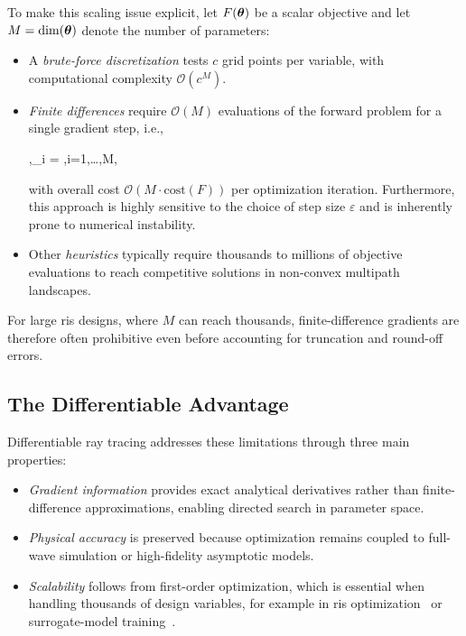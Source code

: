 To make this scaling issue explicit, let $F(\boldsymbol{\theta})$ be a scalar objective and let $M=\dim(\boldsymbol{\theta})$ denote the number of parameters:
\begin{itemize}
  \item A \emph{brute-force discretization} tests $c$ grid points per variable, with computational complexity $\mathcal{O}(c^M)$.
  \item \emph{Finite differences} require $\mathcal{O}(M)$ evaluations of the forward problem for a single gradient step, i.e.,
    \begin{wideequation}
       \approx {},\quad {}_i = ,\quad i=1,\ldots,M,
    \end{wideequation}
    with overall cost $\mathcal{O}(M\cdot\text{cost}(F))$ per optimization iteration. Furthermore, this approach is highly sensitive to the choice of step size $\varepsilon$ and is inherently prone to numerical instability.
  \item Other \emph{heuristics} typically require thousands to millions of objective evaluations to reach competitive solutions in non-convex multipath landscapes.
\end{itemize}

For large \gls{ris} designs, where $M$ can reach thousands, finite-difference gradients are therefore often prohibitive even before accounting for truncation and round-off errors.

\subsection{The Differentiable Advantage}

Differentiable ray tracing addresses these limitations through three main properties:
\begin{itemize}
  \item \emph{Gradient information} provides exact analytical derivatives rather than finite-difference approximations, enabling directed search in parameter space.
  \item \emph{Physical accuracy} is preserved because optimization remains coupled to full-wave simulation or high-fidelity asymptotic models.
  \item \emph{Scalability} follows from first-order optimization, which is essential when handling thousands of design variables, for example in \gls{ris} optimization~ or surrogate-model training~.
\end{itemize}

